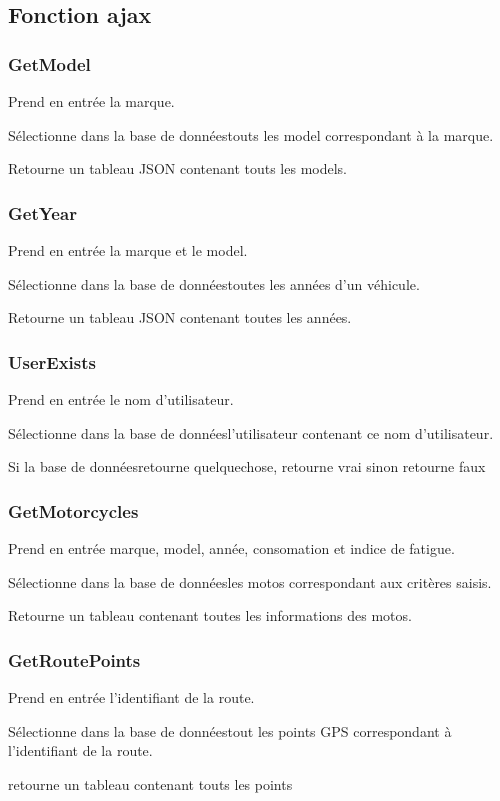 \documentclass[a4paper]{article}
\newcommand{\bdd}{base de données}
\begin{document}
\subsection{Fonction ajax}

\subsubsection{GetModel}
Prend en entrée la marque.

Sélectionne dans la \bdd touts les model correspondant à la marque.

Retourne un tableau JSON contenant touts les models.

\subsubsection{GetYear}	
Prend en entrée la marque et le model.

Sélectionne dans la \bdd toutes les années d'un véhicule.

Retourne un tableau JSON contenant toutes les années.

\subsubsection{UserExists}
Prend en entrée le nom d'utilisateur.

Sélectionne dans la \bdd l'utilisateur contenant ce nom d'utilisateur.

Si la \bdd retourne quelquechose, retourne vrai sinon retourne faux


\subsubsection{GetMotorcycles}
Prend en entrée marque, model, année, consomation et indice de fatigue.

Sélectionne dans la \bdd les motos correspondant aux critères saisis.

Retourne un tableau contenant toutes les informations des motos.

\subsubsection{GetRoutePoints}
Prend en entrée l'identifiant de la route.

Sélectionne dans la \bdd tout les points GPS correspondant à l'identifiant de la route.

retourne un tableau contenant touts les points
\end{document}
